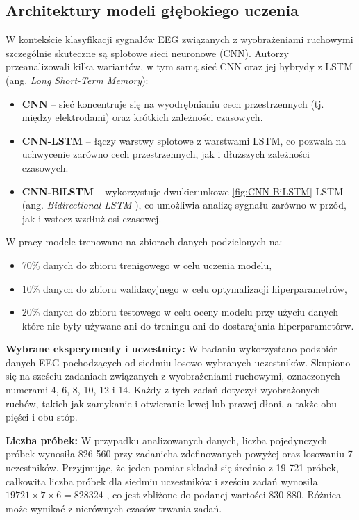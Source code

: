 \documentclass[eeg_v4.tex]{subfiles}
\begin{document}
    \subsection{Architektury modeli głębokiego uczenia}
    W kontekście klasyfikacji sygnałów EEG związanych z wyobrażeniami ruchowymi szczególnie skuteczne są splotowe
    sieci neuronowe (CNN). Autorzy \cite{boutarfaia2023}
    przeanalizowali kilka wariantów, w tym samą sieć CNN oraz jej hybrydy z LSTM (ang. \emph{Long Short-Term Memory}):

    \begin{itemize}
        \item \textbf{CNN}
        -- sieć koncentruje się na wyodrębnianiu cech przestrzennych (tj. między elektrodami) oraz krótkich zależności
        czasowych.
        \item \textbf{CNN-LSTM}
        -- łączy warstwy splotowe z warstwami LSTM, co pozwala na uchwycenie zarówno cech przestrzennych, jak i
        dłuższych zależności czasowych.
        \item \textbf{CNN-BiLSTM} -- wykorzystuje dwukierunkowe \ref{fig:CNN-BiLSTM} LSTM (ang.
        \emph{Bidirectional LSTM}
        ), co umożliwia analizę sygnału zarówno w przód, jak i wstecz wzdłuż osi czasowej.
    \end{itemize}

    W pracy \cite{boutarfaia2023} modele trenowano na zbiorach danych podzielonych na:
    \begin{itemize}
        \item 70\% danych do zbioru trenigowego w celu uczenia modelu,
        \item 10\% danych do zbioru walidacyjnego w celu optymalizacji hiperparametrów,
        \item 20\%
        danych do zbioru testowego w celu oceny modelu przy użyciu danych które nie były używane ani do treningu ani do
        dostarajania hiperparametórw.
    \end{itemize}

    \textbf{Wybrane eksperymenty i uczestnicy:}
    W badaniu wykorzystano podzbiór danych EEG pochodzących od siedmiu losowo wybranych uczestników. Skupiono się na
    sześciu zadaniach związanych z wyobrażeniami ruchowymi, oznaczonych numerami 4, 6, 8, 10, 12 i 14. Każdy z tych
    zadań dotyczył wyobrażonych ruchów, takich jak zamykanie i otwieranie lewej lub prawej dłoni, a także obu pięści i
    obu stóp.

    \textbf{Liczba próbek:}
    W przypadku analizowanych danych, liczba pojedynczych próbek wynosiła 826 560 przy zadanicha zdefinowanych powyżej
    oraz losowaniu 7 uczestników. Przyjmując, że jeden pomiar składał
    się średnio z 19 721 próbek, całkowita liczba próbek dla siedmiu uczestników i sześciu zadań wynosiła
    \(19 721 \times 7 \times 6 = 828 324\)
    , co jest zbliżone do podanej wartości 830 880. Różnica może wynikać z nierównych czasów trwania zadań.
\end{document}

